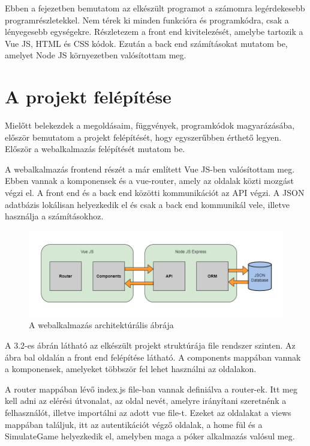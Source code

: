 Ebben a fejezetben bemutatom az elkészült programot a számomra legérdekesebb programrészletekkel. Nem térek ki minden funkcióra és programkódra, csak a lényegesebb egységekre. Részletezem a front end kivitelezését, amelybe tartozik a Vue JS, HTML és CSS kódok. Ezután a back end számításokat mutatom be, amelyet Node JS környezetben valósítottam meg.

\section{A projekt felépítése}
Mielőtt belekezdek a megoldásaim, függvények, programkódok magyarázásába, először bemutatom a projekt felépítését, hogy egyszerűbben érthető legyen. Először a webalkalmazás felépítését mutatom be. 

A webalkalmazás frontend részét a már említett Vue JS-ben valósítottam meg. Ebben vannak a komponensek és a vue-router, amely az oldalak közti mozgást végzi el. A front end és a back end közötti kommunikációt az API végzi. A JSON adatbázis lokálisan helyezkedik el és csak a back end kommunikál vele, illetve használja a számításokhoz.

\begin{figure}[h]
\centering
\includegraphics[scale=0.8]{images/web-arch.png}
\caption{A webalkalmazás architektúrális ábrája}
\label{fig:web-arch}
\end{figure}

A 3.2-es ábrán látható az elkészült projekt struktúrája file rendszer szinten. Az ábra bal oldalán a front end felépítése látható. A components mappában vannak a komponensek, amelyeket többször fel lehet használni az oldalakon. 

A router mappában lévő index.js file-ban vannak definiálva a router-ek. Itt meg kell adni az elérési útvonalat, az oldal nevét, amelyre irányítani szeretnénk a felhasználót, illetve importálni az adott vue file-t. Ezeket az oldalakat a views mappában találjuk, itt az autentikációt végző oldalak, a home fül és a SimulateGame helyezkedik el, amelyben maga a póker alkalmazás valósul meg.

